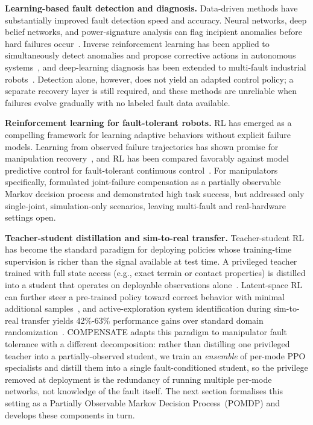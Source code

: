 \documentclass{article}
\begin{document}
	\textbf{Learning-based fault detection and diagnosis.} Data-driven methods have substantially improved
	fault detection speed and accuracy. Neural networks, deep belief networks, and power-signature analysis
	can flag incipient anomalies before hard failures occur~\citep{eski2011fault, sabry2019fault,
	shuai2022research, raouf2022mechanical}. Inverse reinforcement learning has been applied to
	simultaneously detect anomalies and propose corrective actions in autonomous
	systems~\citep{lian2022anomaly}, and deep-learning diagnosis has been extended to multi-fault
	industrial robots~\citep{adam2023multiple}. Detection alone, however, does not yield an adapted
	control policy; a separate recovery layer is still required, and these methods are unreliable when
	failures evolve gradually with no labeled fault data available.

	\textbf{Reinforcement learning for fault-tolerant robots.} RL has emerged as a compelling framework
	for learning adaptive behaviors without explicit failure models. Learning from observed
	failure trajectories has shown promise for manipulation recovery~\citep{huang2025fail2progress,
	wang2025learning}, and RL has been compared favorably against model predictive control for
	fault-tolerant continuous control~\citep{ahmed2018comparison}. For manipulators specifically,
	\citet{pham2024adaptive} formulated joint-failure compensation as a partially observable Markov
	decision process and demonstrated high task success, but addressed only single-joint, simulation-only
	scenarios, leaving multi-fault and real-hardware settings open.

	\textbf{Teacher-student distillation and sim-to-real transfer.} Teacher-student RL has become the
	standard paradigm for deploying policies whose training-time supervision is richer than the
	signal available at test time. A privileged teacher trained with full state access (e.g., exact
	terrain or contact properties) is distilled into a student that operates on deployable
	observations alone~\citep{kumar2021rma}. Latent-space RL can further steer a pre-trained policy
	toward correct behavior with minimal additional samples~\citep{wagenmaker2025steering}, and
	active-exploration system identification during sim-to-real transfer yields 42\%-63\%
	performance gains over standard domain randomization~\citep{sobanbabu2025sampling}.
	COMPENSATE adapts this paradigm to manipulator fault tolerance with a different decomposition:
	rather than distilling one privileged teacher into a partially-observed student, we train an
	\emph{ensemble} of per-mode PPO specialists and distill them into a single fault-conditioned
	student, so the privilege removed at deployment is the redundancy of running multiple per-mode
	networks, not knowledge of the fault itself. The next section formalises this setting as a
	Partially Observable Markov Decision Process~(POMDP) and develops these components in turn.
\end{document}
